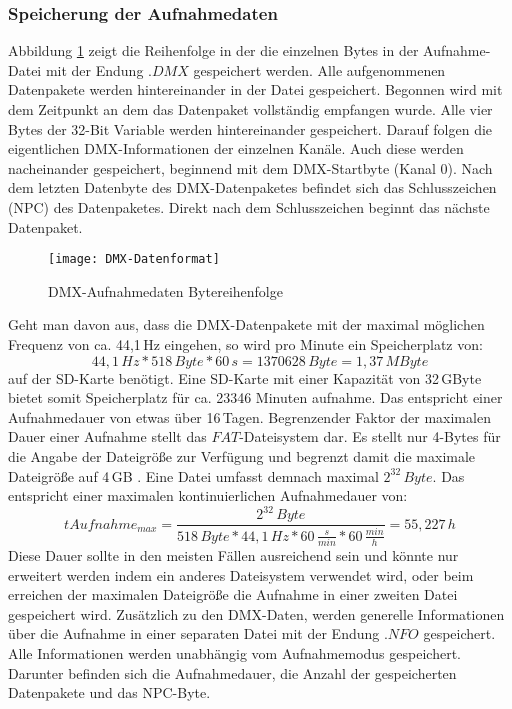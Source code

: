 \subsubsection{Speicherung der Aufnahmedaten}
Abbildung \ref{fig:DMXDatenformat} zeigt die Reihenfolge in der die einzelnen Bytes in der Aufnahme-Datei mit der Endung $.DMX$ gespeichert werden. Alle aufgenommenen Datenpakete werden hintereinander in der Datei gespeichert. Begonnen wird mit dem Zeitpunkt an dem das Datenpaket vollständig empfangen wurde. Alle vier Bytes der 32-Bit Variable werden hintereinander gespeichert. Darauf folgen die eigentlichen DMX-Informationen der einzelnen Kanäle. Auch diese werden nacheinander gespeichert, beginnend mit dem DMX-Startbyte (Kanal 0). Nach dem letzten Datenbyte des DMX-Datenpaketes befindet sich das Schlusszeichen (NPC) des Datenpaketes. Direkt nach dem Schlusszeichen beginnt das nächste Datenpaket. 
\begin{figure}[h]
	\begin{center}
		\texttt{[image: DMX-Datenformat]}
		\caption{DMX-Aufnahmedaten Bytereihenfolge}
		\label{fig:DMXDatenformat}
	\end{center}
\end{figure} Geht man davon aus, dass die DMX-Datenpakete mit der maximal möglichen Frequenz von ca. 44,1\,Hz eingehen, so wird pro Minute ein Speicherplatz von:
\begin{equation}
	44,1\,Hz * 518\,Byte * 60\,s = 1370628\,Byte = 1,37\,MByte
\end{equation} auf der SD-Karte benötigt. Eine SD-Karte mit einer Kapazität von 32\,GByte bietet somit Speicherplatz für ca. 23346 Minuten aufnahme. Das entspricht einer Aufnahmedauer von etwas über 16\,Tagen. Begrenzender Faktor der maximalen Dauer einer Aufnahme stellt das $FAT$-Dateisystem dar. Es stellt nur 4-Bytes für die Angabe der Dateigröße zur Verfügung und begrenzt damit die maximale Dateigröße auf 4\,GB \cite[s. 128]{BetriebssystemeKompakt}. Eine Datei umfasst demnach maximal $2^{32}\,Byte$. Das entspricht einer maximalen kontinuierlichen Aufnahmedauer von:
\begin{equation}
	tAufnahme_{max} = \frac{2^{32}\,Byte}{518\,Byte * 44,1\,Hz * 60\,\frac{s}{min} * 60\,\frac{min}{h}} = 55,227\,h
\end{equation}
Diese Dauer sollte in den meisten Fällen ausreichend sein und könnte nur erweitert werden indem ein anderes Dateisystem verwendet wird, oder beim erreichen der maximalen Dateigröße die Aufnahme in einer zweiten Datei gespeichert wird. 
Zusätzlich zu den DMX-Daten, werden generelle Informationen über die Aufnahme in einer separaten Datei mit der Endung $.NFO$ gespeichert. Alle Informationen werden unabhängig vom Aufnahmemodus gespeichert. Darunter befinden sich die Aufnahmedauer, die Anzahl der gespeicherten Datenpakete und das NPC-Byte.

